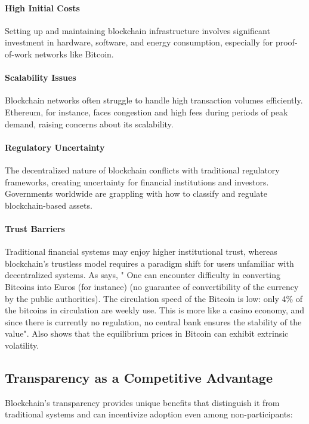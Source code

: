 \paragraph{High Initial Costs}
Setting up and maintaining blockchain infrastructure involves significant investment in hardware, software, and energy consumption, especially for proof-of-work networks like Bitcoin.

\paragraph{Scalability Issues}
Blockchain networks often struggle to handle high transaction volumes efficiently. Ethereum, for instance, faces congestion and high fees during periods of peak demand, raising concerns about its scalability. \cite{hinzen_bitcoins_2022}

\paragraph{Regulatory Uncertainty}
The decentralized nature of blockchain conflicts with traditional regulatory frameworks, creating uncertainty for financial institutions and investors. Governments worldwide are grappling with how to classify and regulate blockchain-based assets.

\paragraph{Trust Barriers}
Traditional financial systems may enjoy higher institutional trust, whereas blockchain's trustless model requires a paradigm shift for users unfamiliar with decentralized systems. As  says, " One can encounter difficulty in converting
Bitcoins into Euros (for instance) (no guarantee of convertibility of the currency by the public
authorities). The circulation speed of the Bitcoin is low: only 4\% of the bitcoins in circulation are weekly use. This is more like a casino economy, and since there is currently no regulation, no
central bank ensures the stability of the value". Also  shows that the equilibrium prices in Bitcoin can exhibit extrinsic volatility.

\subsection{Transparency as a Competitive Advantage}

Blockchain's transparency provides unique benefits that distinguish it from traditional systems and can incentivize adoption even among non-participants:

